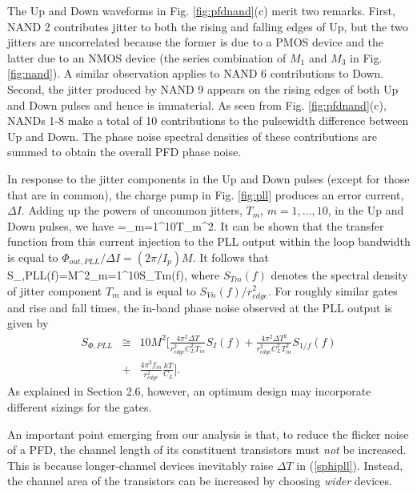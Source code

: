 The Up and Down waveforms in Fig. \ref{fig:pfdnand}(c) merit two remarks. First, NAND 2 contributes jitter to both the rising
and falling edges of Up, but the two jitters are uncorrelated because the former is due to a PMOS device and the latter
due to an NMOS device (the series combination of $M_1$ and $M_3$ in Fig. \ref{fig:nand}). A similar observation applies to NAND 6
contributions to Down. Second, the jitter produced by NAND 9 appears on the rising edges of both Up and
Down pulses and hence is immaterial.
As seen from Fig. \ref{fig:pfdnand}(c), NANDs 1-8 make a total of 10 contributions to the pulsewidth
difference between Up and Down. The phase noise spectral densities of these contributions
are summed to obtain the overall PFD phase noise. 

{In response to the jitter components in the Up and Down pulses (except for those that are in common), the charge pump in Fig.
\ref{fig:pll} produces an error current, $\Delta I$.
Adding up the powers of uncommon jitters, $T_m$, $m=1,...,10$, in the Up and Down pulses, we have
\beq
{}=\sum_{m=1}^{10}T_m^2.
\label{deltai2}
\eeq
It can be shown that the transfer function from this current injection to the PLL output within the loop bandwidth is equal to $\Phi_{out,
PLL}/\Delta I =(2\pi/I_p)M$. It follows that 
\beq
S_{\Phi,PLL}(f)=M^2\sum_{m=1}^{10}S_{Tm}(f),
\label{sphipll0}
\eeq
where $S_{Tm}(f)$ denotes the spectral density of jitter component $T_m$ and is equal to $S_{Vn}(f)/r_{edge}^2$.
}
For roughly similar gates and rise and fall times, the in-band phase noise observed at the PLL output is given by
\begin{eqnarray}
S_{\Phi,PLL}\!\!\!\!&\cong&\!\!\!\! 10 M^2 [\frac{4\pi^2{\Delta T}}{r_{edge}^2 C_L^2 T_{in}}S_{I}(f) + \frac{4\pi^2{\Delta T}^2}{r_{edge}^2 C_L^2 T_{in}^2}S_{1/f}(f)\nonumber  \\ 
&+&\!\!\!\!\frac{4 \pi^2 f_{in}}{r_{edge}^2}\frac{kT}{C_L}].
\label{sphipll}
\end{eqnarray}
As explained in Section 2.6, however, an optimum design may incorporate different sizings for the gates. 


An important point emerging from our analysis is that, to reduce the flicker noise of a PFD, the channel length
of its constituent transistors must {\em not} be increased. This is because longer-channel devices inevitably raise
$\Delta T$ in (\ref{sphipll}). Instead, the channel area of the transistors can be increased by choosing {\em
wider} devices.

